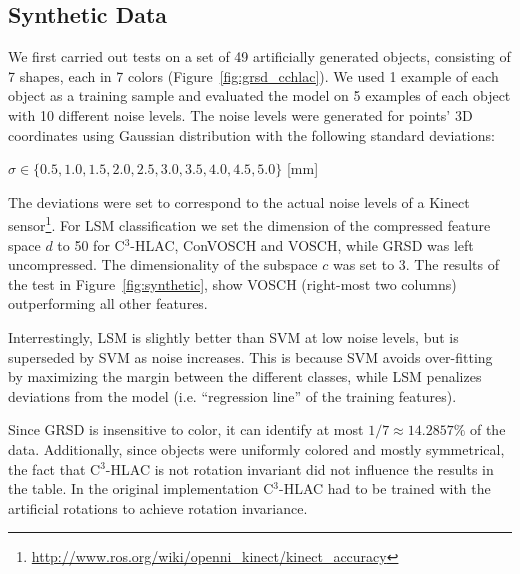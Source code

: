 \documentclass[letterpaper, 10 pt, conference]{sty/ieeeconf}
\begin{document}
\subsection{Synthetic Data}
We first carried out tests on a set of 49 artificially generated objects, consisting of
7 shapes, each in 7 colors (Figure~\ref{fig:grsd_cchlac}). We used 1 example of 
each object as a training sample and evaluated the model on 5 examples of each object with 
10 different noise levels. The noise levels were generated for points' 3D coordinates 
using Gaussian distribution with the following standard deviations:
\begin{center}
$\sigma \in \{0.5, 1.0, 1.5, 2.0, 2.5, 3.0, 3.5, 4.0, 4.5, 5.0\}$ [mm]
\end{center}
The deviations were set to correspond to the actual noise levels of a Kinect 
sensor\footnote{\url{http://www.ros.org/wiki/openni_kinect/kinect_accuracy}}.
For LSM classification we set the dimension of the compressed feature space $d$ to 
50 for C$^3$-HLAC, ConVOSCH and VOSCH, while GRSD was left uncompressed. 
The dimensionality of the subspace $c$ was set to 3.
The results of the test in Figure~\ref{fig:synthetic},
show VOSCH (right-most two columns) outperforming all other features.

Interrestingly, LSM is slightly better than SVM at low noise levels, but is superseded
by SVM as noise increases. This is because SVM avoids over-fitting by maximizing the margin
between the different classes, while LSM penalizes deviations from the model
(i.e. ``regression line'' of the training features).


Since GRSD is insensitive to color, it can identify at most $1/7 \approx 14.2857\%$ of the data.
Additionally, since objects were uniformly colored and mostly symmetrical, the fact that C$^3$-HLAC 
is not rotation invariant did not influence the results in the table. In the original implementation C$^3$-HLAC 
had to be trained with the artificial rotations to achieve rotation invariance.
\end{document}
